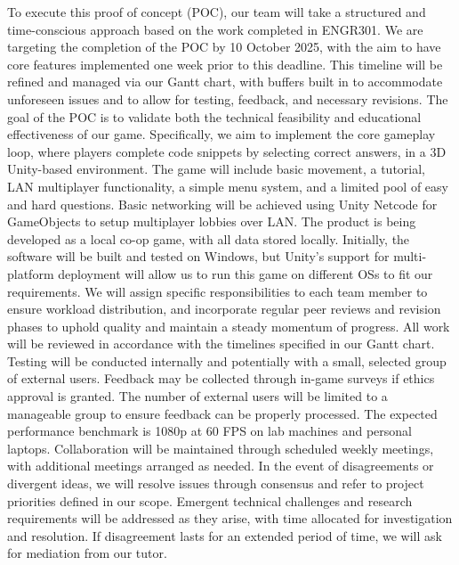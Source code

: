 \documentclass{article}
\begin{document}
To execute this proof of concept (POC), our team will take a structured and time-conscious approach based on the work completed in ENGR301. We are targeting the completion of the POC by 10 October 2025, with the aim to have core features implemented one week prior to this deadline. This timeline will be refined and managed via our Gantt chart, with buffers built in to accommodate unforeseen issues and to allow for testing, feedback, and necessary revisions.
\newline\newline
The goal of the POC is to validate both the technical feasibility and educational effectiveness of our game. Specifically, we aim to implement the core gameplay loop, where players complete code snippets by selecting correct answers, in a 3D Unity-based environment. The game will include basic movement, a tutorial, LAN multiplayer functionality, a simple menu system, and a limited pool of easy and hard questions. Basic networking will be achieved using Unity  Netcode for GameObjects to setup multiplayer lobbies over LAN. 
\newline\newline
The product is being developed as a local co-op game, with all data stored locally. Initially, the software will be built and tested on Windows, but Unity’s support for multi-platform deployment will allow us to run this game on different OSs to fit our requirements.
\newline\newline
We will assign specific responsibilities to each team member to ensure workload distribution, and incorporate regular peer reviews and revision phases to uphold quality and maintain a steady momentum of progress. All work will be reviewed in accordance with the timelines specified in our Gantt chart.
\newline\newline
Testing will be conducted internally and potentially with a small, selected group of external users. Feedback may be collected through in-game surveys if ethics approval is granted. The number of external users will be limited to a manageable group to ensure feedback can be properly processed. The expected performance benchmark is 1080p at 60 FPS on lab machines and personal laptops.
\newline\newline
Collaboration will be maintained through scheduled weekly meetings, with additional meetings arranged as needed. In the event of disagreements or divergent ideas, we will resolve issues through consensus and refer to project priorities defined in our scope. Emergent technical challenges and research requirements will be addressed as they arise, with time allocated for investigation and resolution. If disagreement lasts for an extended period of time, we will ask for mediation from our tutor.
\end{document}
